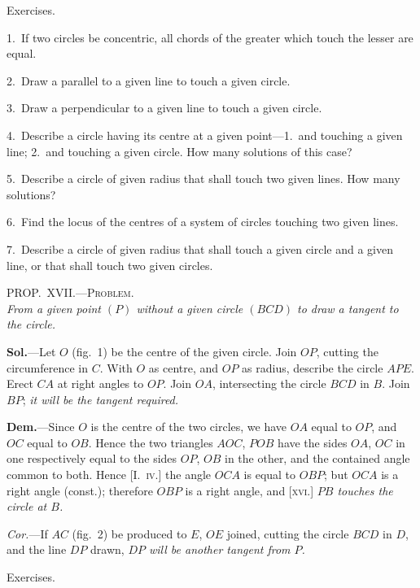 \documentclass[oneside]{book}
\newcommand\myprop[2]{
\bigskip\Needspace*{4\baselineskip}\begin{center}\textsc{#1}\\\medskip\emph{#2}\par\end{center}
}
\newcommand\exhead[1]{
\Needspace*{5\baselineskip}\begin{center}
\textsf{#1}
\end{center}
}
\newcommand\imgcent[2]{
\begin{center}
\end{center}
}
\begin{document}
\exhead{Exercises.}

\begin{footnotesize}
1.~If two circles be concentric, all chords of the greater which
touch the lesser are equal.

2.~Draw a parallel to a given line to touch a given circle.

3.~Draw a perpendicular to a given line to touch a given
circle.

4.~Describe a circle having its centre at a given point---1.~and
touching a given line; 2.~and touching a given circle. How
many solutions of this case?

5.~Describe a circle of given radius that shall touch two given
lines. How many solutions?

6.~Find the locus of the centres of a system of circles touching
two given lines.

7.~Describe a circle of given radius that shall touch a given
circle and a given line, or that shall touch two given circles.
\par\end{footnotesize}

\myprop{PROP\@.~XVII\@.---Problem.}{From a given point $(P)$ without a given circle $(BCD)$ to
draw a tangent to the circle.}

\imgcent{295}{f123}

\textbf{Sol.}---Let $O$ (fig.~1) be the centre of the given circle.
Join $OP$, cutting the circumference in $C$. With $O$ as
centre, and $OP$ as radius, describe the circle $APE$.
Erect $CA$ at right angles to $OP$. Join $OA$, intersecting
the circle $BCD$ in $B$. Join $BP$; \emph{it will be the
tangent required.}

\textbf{Dem.}---Since $O$ is the centre of the two circles,
we have $OA$ equal to $OP$, and $OC$ equal to $OB$.
Hence the two triangles $AOC$, $POB$ have the sides
$OA$, $OC$ in one respectively equal to the sides $OP$, $OB$
in the other, and the contained angle common to both.
Hence [I.~\textsc{iv.}] the angle $OCA$ is equal to $OBP$; but
$OCA$ is a right angle (const.); therefore $OBP$ is a
right angle, and [\textsc{xvi.}] \emph{$PB$ touches the circle at $B$.}

\emph{Cor.}---If $AC$ (fig.~2) be produced to $E$, $OE$ joined,
cutting the circle $BCD$ in $D$, and the line $DP$ drawn,
\emph{$DP$ will be another tangent from $P$.}

\exhead{Exercises.}
\end{document}
